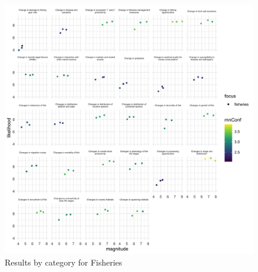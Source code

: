 \documentclass[
]{article}
\begin{document}
\begin{figure}
\centering
\includegraphics[width=1\textwidth,height=\textheight]{Figs/Fig3.png}
\caption{Results by category for Fisheries}
\end{figure}
\end{document}
